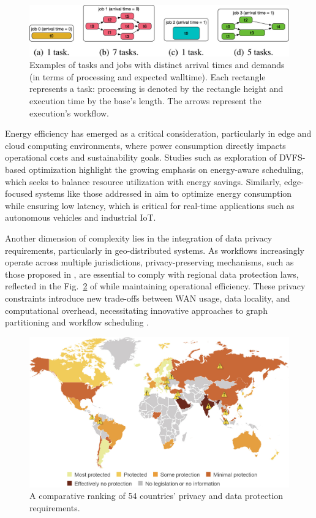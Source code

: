 \documentclass[a4paper, final]{article}
\begin{document}
\begin{figure}[H]
   \centering
   \includegraphics[scale=1.5]{dag.jpg}
   \caption{Examples of tasks and jobs with distinct arrival times and demands (in terms of processing and expected 
   walltime). Each rectangle represents a task: processing is denoted by the rectangle height and execution time by 
   the base’s length. The arrows represent the execution’s workflow.}
   \label{fig:1}
\end{figure}

Energy efficiency has emerged as a critical consideration, particularly in edge and cloud computing environments, 
where power consumption directly impacts operational costs and sustainability goals. Studies such as
exploration of DVFS-based optimization \cite{bib:5_epee} highlight the growing emphasis on energy-aware scheduling, 
which seeks to balance resource utilization with energy savings. Similarly, edge-focused systems like those addressed 
in \cite{bib:3_sandcat} aim to optimize energy consumption while ensuring low latency, which is 
critical for real-time applications such as autonomous vehicles and industrial IoT.

Another dimension of complexity lies in the integration of data privacy requirements, particularly in geo-distributed 
systems. As workflows increasingly operate across multiple jurisdictions, privacy-preserving mechanisms, such as those 
proposed in \cite{bib:7_ppps}, are essential to comply with regional data protection laws, reflected in the Fig.~\ref{fig:privacy}
of \cite{bib:7_ppps} while maintaining operational efficiency. These privacy constraints introduce new trade-offs between WAN usage, data 
locality, and computational overhead, necessitating innovative approaches to graph partitioning and workflow 
scheduling \cite{bib:8}.

\begin{figure}[H]
   \centering
   \includegraphics[scale=1.5]{privacy.jpg}
   \caption{A comparative ranking of 54 countries’ privacy and data protection requirements.}
   \label{fig:privacy}
\end{figure}
\end{document}
